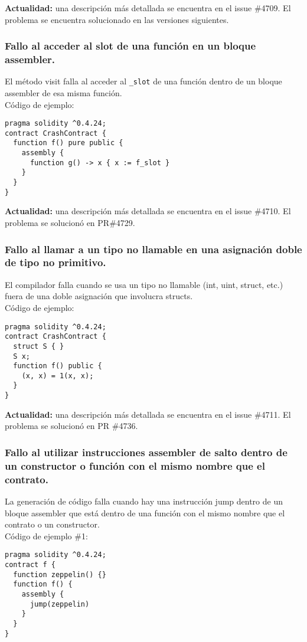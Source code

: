 \textbf{Actualidad:} una descripción más detallada se encuentra en el issue \#4709. El problema se encuentra solucionado en las versiones siguientes. 

\subsubsection{Fallo al acceder al slot de una función en un bloque assembler.}

El método visit falla al acceder al \verb|_slot| de una función dentro de un bloque assembler de esa misma función.\\

Código de ejemplo:
\begin{lstlisting}[language=Solidity]
pragma solidity ^0.4.24;
contract CrashContract {
  function f() pure public {
    assembly {
      function g() -> x { x := f_slot }
    }
  }
}
\end{lstlisting}

\textbf{Actualidad:} una descripción más detallada se encuentra en el issue \#4710. El problema se solucionó en PR\#4729.

\subsubsection{Fallo al llamar a un tipo no llamable en una asignación doble de tipo no primitivo.}

El compilador falla cuando se usa un tipo no llamable (int, uint, struct, etc.) fuera de una doble asignación que involucra structs.\\

Código de ejemplo:
\begin{lstlisting}[language=Solidity]
pragma solidity ^0.4.24;
contract CrashContract {
  struct S { }
  S x;
  function f() public {
    (x, x) = 1(x, x);
  }
}
\end{lstlisting}

\textbf{Actualidad:} una descripción más detallada se encuentra en el issue \#4711. El problema se solucionó en PR \#4736.

\subsubsection{Fallo al utilizar instrucciones assembler de salto dentro de un constructor o función con el mismo nombre que el contrato.}

La generación de código falla cuando hay una instrucción jump dentro de un bloque assembler que está dentro de una función con el mismo nombre que el contrato o un constructor.\\
Código de ejemplo \#1:
\begin{lstlisting}[language=Solidity]
pragma solidity ^0.4.24;
contract f {
  function zeppelin() {}
  function f() {
    assembly {
      jump(zeppelin)
    }
  }
}
\end{lstlisting}


